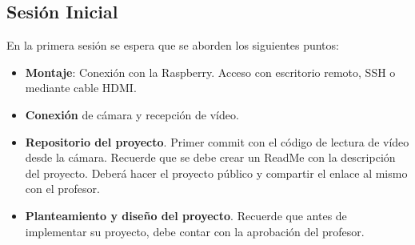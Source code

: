 \subsection*{Sesión Inicial}
{}
\vspace{5mm}
En la primera sesión se espera que se aborden los siguientes puntos:

\begin{itemize}
    \item \textbf{Montaje}: Conexión con la Raspberry. Acceso con escritorio remoto, SSH o mediante cable HDMI.
    \item \textbf{Conexión} de cámara y recepción de vídeo.
    \item \textbf{Repositorio del proyecto}. Primer commit con el código de lectura de vídeo desde la cámara. Recuerde que se debe crear un ReadMe con la descripción del proyecto. Deberá hacer el proyecto público y compartir el enlace al mismo con el profesor.
    \item  \textbf{Planteamiento y diseño del proyecto}. Recuerde que antes de implementar su proyecto, debe contar con la aprobación del profesor.
\end{itemize}